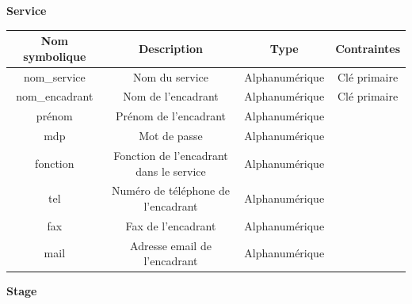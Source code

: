 \documentclass{scrreprt}
\begin{document}
\begin{flushleft}
\textbf{Service}
\end{flushleft}

\begin{tabular}{|c|c|c|c|}
\hline
\textbf{Nom symbolique} & \textbf{Description} & \textbf{Type} & \textbf{Contraintes} \\
\hline
nom\_service & Nom du service & Alphanum\'erique & Cl\'e primaire \\
nom\_encadrant & Nom de l'encadrant & Alphanum\'erique & Cl\'e primaire \\
pr\'enom & Pr\'enom de l'encadrant & Alphanum\'erique & \\
mdp & Mot de passe & Alphanum\'erique & \\
fonction & Fonction de l'encadrant dans le service & Alphanum\'erique & \\
tel & Num\'ero de t\'el\'ephone de l'encadrant & Alphanum\'erique & \\
fax & Fax de l'encadrant & Alphanum\'erique & \\
mail & Adresse email de l'encadrant & Alphanum\'erique \\
\hline
\end{tabular}

\newpage
\begin{flushleft}
\textbf{Stage}
\end{flushleft}
\end{document}
